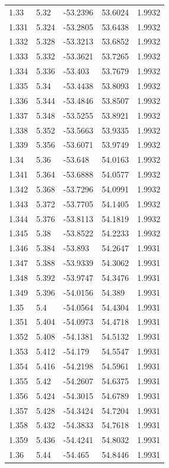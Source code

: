 \begin{tabular}{lllll}
1.33 & 5.32 & -53.2396 & 53.6024 & 1.9932 \\
1.331 & 5.324 & -53.2805 & 53.6438 & 1.9932 \\
1.332 & 5.328 & -53.3213 & 53.6852 & 1.9932 \\
1.333 & 5.332 & -53.3621 & 53.7265 & 1.9932 \\
1.334 & 5.336 & -53.403 & 53.7679 & 1.9932 \\
1.335 & 5.34 & -53.4438 & 53.8093 & 1.9932 \\
1.336 & 5.344 & -53.4846 & 53.8507 & 1.9932 \\
1.337 & 5.348 & -53.5255 & 53.8921 & 1.9932 \\
1.338 & 5.352 & -53.5663 & 53.9335 & 1.9932 \\
1.339 & 5.356 & -53.6071 & 53.9749 & 1.9932 \\
1.34 & 5.36 & -53.648 & 54.0163 & 1.9932 \\
1.341 & 5.364 & -53.6888 & 54.0577 & 1.9932 \\
1.342 & 5.368 & -53.7296 & 54.0991 & 1.9932 \\
1.343 & 5.372 & -53.7705 & 54.1405 & 1.9932 \\
1.344 & 5.376 & -53.8113 & 54.1819 & 1.9932 \\
1.345 & 5.38 & -53.8522 & 54.2233 & 1.9932 \\
1.346 & 5.384 & -53.893 & 54.2647 & 1.9931 \\
1.347 & 5.388 & -53.9339 & 54.3062 & 1.9931 \\
1.348 & 5.392 & -53.9747 & 54.3476 & 1.9931 \\
1.349 & 5.396 & -54.0156 & 54.389 & 1.9931 \\
1.35 & 5.4 & -54.0564 & 54.4304 & 1.9931 \\
1.351 & 5.404 & -54.0973 & 54.4718 & 1.9931 \\
1.352 & 5.408 & -54.1381 & 54.5132 & 1.9931 \\
1.353 & 5.412 & -54.179 & 54.5547 & 1.9931 \\
1.354 & 5.416 & -54.2198 & 54.5961 & 1.9931 \\
1.355 & 5.42 & -54.2607 & 54.6375 & 1.9931 \\
1.356 & 5.424 & -54.3015 & 54.6789 & 1.9931 \\
1.357 & 5.428 & -54.3424 & 54.7204 & 1.9931 \\
1.358 & 5.432 & -54.3833 & 54.7618 & 1.9931 \\
1.359 & 5.436 & -54.4241 & 54.8032 & 1.9931 \\
1.36 & 5.44 & -54.465 & 54.8446 & 1.9931 \\

\end{tabular}
